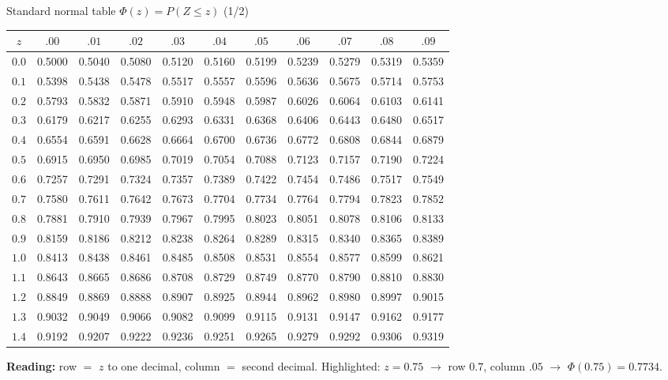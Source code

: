 \documentclass[aspectratio=169,11pt]{beamer}
\begin{document}
\begin{frame}{Standard normal table $\Phi(z)=P(Z\le z)$ (1/2)}
  \begin{center}
    \scriptsize\setlength{\tabcolsep}{3.2pt}\renewcommand{\arraystretch}{0.96}
    \begin{tabular}{c|cccccccccc}
      \toprule
      $z$ & $.00$ & $.01$ & $.02$ & $.03$ & $.04$ & $.05$ & $.06$ & $.07$ & $.08$ & $.09$\\
      \midrule
      $0.0$ & 0.5000 & 0.5040 & 0.5080 & 0.5120 & 0.5160 & 0.5199 & 0.5239 & 0.5279 & 0.5319 & 0.5359 \\
      $0.1$ & 0.5398 & 0.5438 & 0.5478 & 0.5517 & 0.5557 & 0.5596 & 0.5636 & 0.5675 & 0.5714 & 0.5753 \\
      $0.2$ & 0.5793 & 0.5832 & 0.5871 & 0.5910 & 0.5948 & 0.5987 & 0.6026 & 0.6064 & 0.6103 & 0.6141 \\
      $0.3$ & 0.6179 & 0.6217 & 0.6255 & 0.6293 & 0.6331 & 0.6368 & 0.6406 & 0.6443 & 0.6480 & 0.6517 \\
      $0.4$ & 0.6554 & 0.6591 & 0.6628 & 0.6664 & 0.6700 & 0.6736 & 0.6772 & 0.6808 & 0.6844 & 0.6879 \\
      $0.5$ & 0.6915 & 0.6950 & 0.6985 & 0.7019 & 0.7054 & 0.7088 & 0.7123 & 0.7157 & 0.7190 & 0.7224 \\
      $0.6$ & 0.7257 & 0.7291 & 0.7324 & 0.7357 & 0.7389 & 0.7422 & 0.7454 & 0.7486 & 0.7517 & 0.7549 \\
      $0.7$ & 0.7580 & 0.7611 & 0.7642 & 0.7673 & 0.7704 & \cellcolor{hsbiorange!35}0.7734 & 0.7764 & 0.7794 & 0.7823 & 0.7852 \\
      $0.8$ & 0.7881 & 0.7910 & 0.7939 & 0.7967 & 0.7995 & 0.8023 & 0.8051 & 0.8078 & 0.8106 & 0.8133 \\
      $0.9$ & 0.8159 & 0.8186 & 0.8212 & 0.8238 & 0.8264 & 0.8289 & 0.8315 & 0.8340 & 0.8365 & 0.8389 \\
      $1.0$ & 0.8413 & 0.8438 & 0.8461 & 0.8485 & 0.8508 & 0.8531 & 0.8554 & 0.8577 & 0.8599 & 0.8621 \\
      $1.1$ & 0.8643 & 0.8665 & 0.8686 & 0.8708 & 0.8729 & 0.8749 & 0.8770 & 0.8790 & 0.8810 & 0.8830 \\
      $1.2$ & 0.8849 & 0.8869 & 0.8888 & 0.8907 & 0.8925 & 0.8944 & 0.8962 & 0.8980 & 0.8997 & 0.9015 \\
      $1.3$ & 0.9032 & 0.9049 & 0.9066 & 0.9082 & 0.9099 & 0.9115 & 0.9131 & 0.9147 & 0.9162 & 0.9177 \\
      $1.4$ & 0.9192 & 0.9207 & 0.9222 & 0.9236 & 0.9251 & 0.9265 & 0.9279 & 0.9292 & 0.9306 & 0.9319 \\
      \bottomrule
    \end{tabular}
  \end{center}
  {\footnotesize \textbf{Reading:} row $=$ $z$ to one decimal, column $=$
  second decimal. Highlighted: $z=0.75$ $\to$ row $0.7$, column $.05$ $\to$
  $\Phi(0.75)=0.7734$.}
\end{frame}
\end{document}
